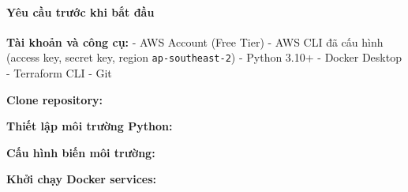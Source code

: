 \hypertarget{yuxeau-cux1ea7u-trux1b0ux1edbc-khi-bux1eaft-ux111ux1ea7u}{%
\paragraph{Yêu cầu trước khi bắt
đầu}}

\textbf{Tài khoản và công cụ:} - AWS Account (Free Tier) - AWS CLI đã
cấu hình (access key, secret key, region \texttt{ap-southeast-2}) -
Python 3.10+ - Docker Desktop - Terraform CLI - Git

\textbf{Clone repository:}

\begin{Shaded}
\begin{Highlighting}[]
\OperatorTok{\textless{}}\OperatorTok{\textgreater{}}
\end{Highlighting}
\end{Shaded}

\textbf{Thiết lập môi trường Python:}

\begin{Shaded}
\begin{Highlighting}[]
 
\end{Highlighting}
\end{Shaded}

\textbf{Cấu hình biến môi trường:}

\begin{Shaded}
\begin{Highlighting}[]
\end{Highlighting}
\end{Shaded}

\textbf{Khởi chạy Docker services:}

\begin{Shaded}
\begin{Highlighting}[]
\end{Highlighting}
\end{Shaded}

